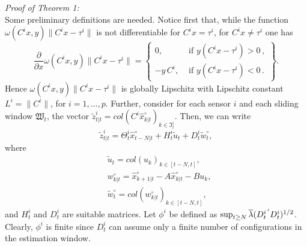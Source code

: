 \documentclass[11pt,journal,onecolumn]{IEEEtran}
\begin{document}
{\em Proof of Theorem 1:}\\
Some preliminary definitions are needed. Notice first that, while the function $\omega(C^{i}x,y)\|C^{i}x-\tau^{i}\|$ is not differentiable for $C^{i}x=\tau^{i}$, for $C^{i}x \ne \tau^{i}$ one has
\[
\frac{\partial}{\partial x}  \omega(C^{i}x,y)\|C^{i}x-\tau^{i}\| = \left \{ \begin{array}{ll} 0, & \mbox{ if } y(C^{i}x-\tau^{i}) > 0 \, , \\ - y \, C^i , & \mbox{ if } y(C^{i}x-\tau^{i}) < 0 \, .\end{array} \right\} .
\]
Hence $\omega(C^{i}x,y)\|C^{i}x-\tau^{i}\|$ is globally Lipschitz with Lipschitz constant $L^{i} = \| C^i \|$, for $i=1,\ldots,p$. Further, consider for each sensor $i$ and each sliding window $\mathfrak W_t$, the vector $\tilde{z}^{i}_{t|t}=col(C^{i}\hat{x}_{k|t}^{\circ})_{k\in\mathfrak{I}_{t}^{i}}$. Then, we can write
\begin{equation*}\label{49}
\tilde{z}^{i}_{t|t}=\Theta_{t}^{i}\hat{x}_{t-N|t}^{\circ}+H_{t}^{i}\tilde{u}_{t}+D_{t}^{i}\tilde{w}_{t}^{\circ},
\end{equation*}
where
\begin{equation*}\label{48}
\begin{split}
&\tilde{u}_{t}=col(u_{k})_{k\in[t-N,t]}, \\
&w_{k|t}^{\circ}=\hat{x}_{k+1|t}^{\circ}-A\hat{x}_{k|t}^{\circ}-Bu_{k}, \\
&\tilde{w}_{t}^{\circ}=col(w_{k|t}^{\circ})_{k\in[t-N,t]},
\end{split}
\end{equation*}
and $H_{t}^{i}$ and $D_{t}^{i}$ are suitable matrices. Let $\phi^i$ be defined as
$\sup_{t \ge N} \overline{\lambda}({D}_{t}^{i\hspace{0.5mm}'} {D}^i_{t})^{1/2}$. Clearly, $\phi^i$ is finite since  $D^i_t$ can assume only a finite number of configurations in the estimation window.
\end{document}
